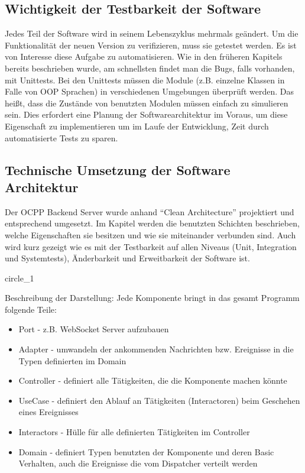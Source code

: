 \documentclass{article}
\begin{document}
    \subsection{Wichtigkeit der Testbarkeit der Software}
    Jedes Teil der Software wird in seinem Lebenszyklus mehrmals geändert. 
    Um die Funktionalität der neuen Version zu verifizieren, muss sie getestet werden.
    Es ist von Interesse diese Aufgabe zu automatisieren. 
    Wie in den früheren Kapitels bereits beschrieben wurde, am schnellsten findet man die Bugs, falls vorhanden, mit Unittests. 
    Bei den Unittests müssen die Module (z.B. einzelne Klassen in Falle von OOP Sprachen) in verschiedenen Umgebungen überprüft werden. 
    Das heißt, dass die Zustände von benutzten Modulen müssen einfach zu simulieren sein.
    Dies erfordert eine Planung der Softwarearchitektur im Voraus, 
    um diese Eigenschaft zu implementieren um im Laufe der Entwicklung, Zeit durch automatisierte Tests zu sparen.

    \newpage
    \subsection{Technische Umsetzung der Software Architektur}

    Der OCPP Backend Server wurde anhand ``Clean Architecture'' projektiert und entsprechend umgesetzt. 
    Im Kapitel werden die benutzten Schichten beschrieben, welche Eigenschaften sie besitzen und wie sie miteinander verbunden sind.
    Auch wird kurz gezeigt wie es mit der Testbarkeit auf allen Niveaus (Unit, Integration und Systemtests), 
    Änderbarkeit und Erweitbarkeit der Software ist.

    {circle_1}

    Beschreibung der Darstellung:
    Jede Komponente bringt in das gesamt Programm folgende Teile:
    \begin{itemize}
        \item Port - z.B. WebSocket Server aufzubauen
        \item Adapter  - umwandeln der ankommenden Nachrichten bzw. Ereignisse in die Typen definierten im Domain
        \item Controller - definiert alle Tätigkeiten, die die Komponente machen könnte
        \item UseCase - definiert den Ablauf an Tätigkeiten (Interactoren) beim Geschehen eines Ereignisses
        \item Interactors - Hülle für alle definierten Tätigkeiten im Controller
        \item Domain - definiert Typen benutzten der Komponente und deren Basic Verhalten, auch die Ereignisse die vom Dispatcher verteilt werden
    \end{itemize}
\end{document}
